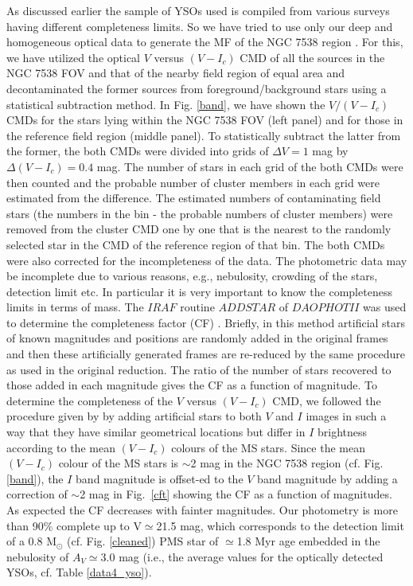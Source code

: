\documentclass[a4paper,fleqn,usenatbib,useAMS]{mnras}
\begin{document}
As discussed earlier the sample of YSOs used is compiled from various surveys having different 
completeness limits. So we have tried to use only our deep and homogeneous optical data to generate the MF of
the NGC 7538 region \citep[cf.][]{2007MNRAS.380.1141S,2008MNRAS.383.1241P,2011MNRAS.415.1202C,2013ApJ...764..172P,2013MNRAS.432.3445J}.
For this, we have utilized the optical $V$ versus $(V-I_c)$ CMD of all the 
sources in the NGC 7538 FOV and that of the nearby field region of equal area
and decontaminated the former sources from foreground/background
stars using a statistical subtraction method.
In  Fig. \ref{band}, we have shown the $V/(V-I_c)$ CMDs for the stars lying within the NGC 7538  FOV  (left panel) and for those in the reference field region (middle panel).
To statistically subtract the latter from the former, the both CMDs were divided
into grids of $\Delta V=1$ mag by $\Delta (V-I_c) = 0.4$  mag. The number of stars in each grid of the both CMDs were then counted
and the probable number of cluster members in each grid were estimated from the difference.
The estimated numbers of contaminating field stars
(the numbers in the bin - the probable numbers of cluster members) were removed from
the cluster CMD one by one that is the nearest to the randomly selected star in the CMD of the reference region of that bin.
The both CMDs were also corrected for the  incompleteness of the data.
The photometric data may be incomplete due to various reasons, e.g., nebulosity, crowding of the stars, 
detection limit etc. In particular it is very important to know the completeness limits  in terms of mass.        
The $IRAF$ routine $ADDSTAR$ of $DAOPHOT II$ was used to determine the 
completeness factor (CF) \citep[for detail, see][]{2008AJ....135.1934S}.
Briefly, in this method artificial stars of known magnitudes and positions 
are randomly added in the original frames and then these artificially generated frames are
re-reduced by the same procedure as used in the original reduction. The ratio of the
number of stars recovered to those added in each magnitude gives the CF as a function of magnitude.
To determine the completeness  of the $V$ versus $(V-I_c)$ CMD, 
we followed the procedure given by \citet{1991A&A...250..324S} by adding artificial 
stars to both $V$ and $I$ images in such a way that they have similar geometrical 
locations but differ in $I$ brightness according to the mean $(V-I_c)$ colours of the 
MS stars. Since the mean $(V-I_c)$ colour of the  MS stars is $\sim$2 mag in the NGC 7538 region 
(cf. Fig. \ref{band}), the $I$ band magnitude is offset-ed to the $V$ band  magnitude by adding a correction 
of $\sim$2 mag in Fig.~\ref{cft} showing the CF as a function of magnitudes. As expected
the CF decreases with fainter magnitudes. Our photometry is more than 90\% complete up to V$\simeq$21.5 mag,
which corresponds to the detection limit of a 0.8 M$_\odot$ (cf. Fig. \ref{cleaned}) PMS star of 
$\simeq$1.8 Myr age embedded in the nebulosity of $A_V\simeq$3.0 mag 
(i.e., the average values for the optically detected YSOs, cf. Table \ref{data4_yso}).
\end{document}
